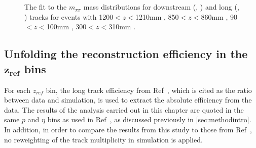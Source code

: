 \begin{figure}
\begin{center}
 
    \\
    \\
  
\end{center}
\caption{The fit to the $m_{\pi\pi}$ mass distributions for downstream (\protect{}, \protect{}) and long (\protect{}, \protect{}) tracks for events with 1200$<z<$1210\:mm \protect{}, 850$<z<$860\:mm \protect{}, 90$<z<$100\:mm \protect{}, 300$<z<$310\:mm \protect{}. %
  \label{fig:mass}}
\end{figure}

  

\FloatBarrier






\subsection[Unfolding the reconstruction efficiency in the $z_{ref}$ bins]{Unfolding the reconstruction efficiency in the $\mathbold{z_{ref}}$ bins}
For each $z_{ref}$ bin, the long track efficiency from Ref~\cite{LHCB-DP-2013-002}, which is cited as the ratio between data and simulation, is used to extract the absolute efficiency from the data. The results of the analysis carried out in this chapter are quoted in the same $p$ and $\eta$ bins as used in Ref~\cite{LHCB-DP-2013-002}, as discussed previously in \autoref{sec:methodintro}. In addition, in order to compare the results from this study to those from Ref~\cite{DDpat}, no reweighting of the track multiplicity in simulation is applied.

